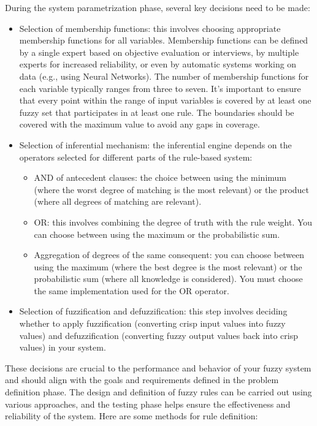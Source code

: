 During the system parametrization phase, several key decisions need to be made:
\begin{itemize}
    \item Selection of membership functions: this involves choosing appropriate membership functions for all variables. 
        Membership functions can be defined by a single expert based on objective evaluation or interviews, by multiple experts for increased reliability, or even by automatic systems working on data (e.g., using Neural Networks). 
        The number of membership functions for each variable typically ranges from three to seven. 
        It's important to ensure that every point within the range of input variables is covered by at least one fuzzy set that participates in at least one rule. 
        The boundaries should be covered with the maximum value to avoid any gaps in coverage.
    \item Selection of inferential mechanism: the inferential engine depends on the operators selected for different parts of the rule-based system:
        \begin{itemize}
            \item AND of antecedent clauses: the choice between using the minimum (where the worst degree of matching is the most relevant) or the product (where all degrees of matching are relevant).
            \item OR: this involves combining the degree of truth with the rule weight. 
                You can choose between using the maximum or the probabilistic sum.
            \item Aggregation of degrees of the same consequent: you can choose between using the maximum (where the best degree is the most relevant) or the probabilistic sum (where all knowledge is considered).
                You must choose the same implementation used for the OR operator. 
        \end{itemize}
    \item Selection of fuzzification and defuzzification: this step involves deciding whether to apply fuzzification (converting crisp input values into fuzzy values) and defuzzification (converting fuzzy output values back into crisp values) in your system.
\end{itemize}
These decisions are crucial to the performance and behavior of your fuzzy system and should align with the goals and requirements defined in the problem definition phase.
The design and definition of fuzzy rules can be carried out using various approaches, and the testing phase helps ensure the effectiveness and reliability of the system. Here are some methods for rule definition: 
